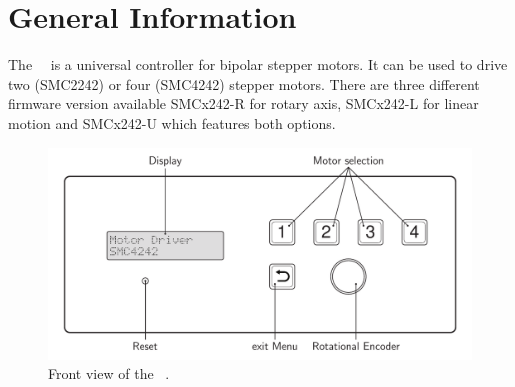 \section{General Information}
The \productNumber ~\productName ~is a universal controller for  bipolar stepper motors. It can be used to drive two (SMC2242) or four (SMC4242) stepper motors. There are three different firmware version available SMCx242-R for rotary axis, SMCx242-L for linear motion and SMCx242-U which features both options.


\begin{figure}[h]
\begin{center}
\includegraphics[width=12cm]{grafiken/SMCxxx2-0006_3_daub_text.pdf}
\end{center}
\caption[Front view of the \productNumber ~\productName.]{Front view of the \productNumber ~\productName.}
\label{frontpanel}
\end{figure}






\newpage